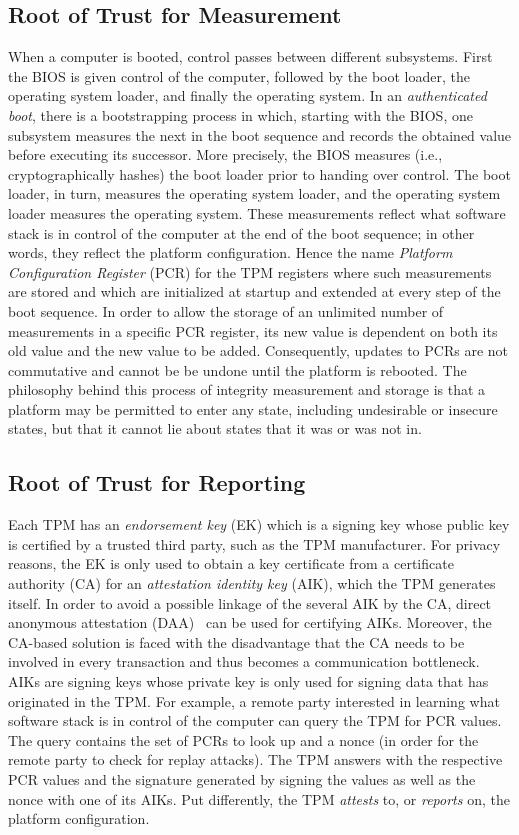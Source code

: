 \documentclass[runningheads]{llncs}
\begin{document}
\subsection{Root of Trust for Measurement}
When a computer is booted, control passes between different subsystems. First the BIOS is given
control of the computer, followed by the boot loader, the operating system loader, and finally the
operating system. In an \emph{authenticated boot}, there is a bootstrapping process in which,
starting with the BIOS, one subsystem measures the next in the boot sequence and records the
obtained value before executing its successor. More precisely, the BIOS measures (i.e.,
cryptographically hashes) the boot loader prior to handing over control. The boot loader, in turn,
measures the operating system loader, and the operating system loader measures the operating system.
These measurements reflect what software stack is in control of the computer at the end of the boot
sequence; in other words, they reflect the platform configuration. Hence the name \emph{Platform
Configuration Register} (PCR) for the TPM registers where such measurements are stored and which
are initialized at startup and extended at every step of the boot sequence. In order to allow the
storage of an unlimited number of measurements in a specific PCR register, its new value is
dependent on both its old value and the new value to be added. Consequently, updates to PCRs are
not commutative and cannot be be undone until the platform is rebooted. The philosophy behind this
process of integrity measurement and storage is that a platform may be permitted to enter any
state, including undesirable or insecure states, but that it cannot lie about states that it was
or was not in.

\subsection{Root of Trust for Reporting}
Each TPM has an \emph{endorsement key} (EK) which is a signing key whose public key is certified by
a trusted third party, such as the TPM manufacturer. For privacy reasons, the EK is only used to
obtain a key certificate from a certificate authority (CA) for an \emph{attestation identity key}
(AIK), which the TPM generates itself. In order to avoid a possible linkage of the several AIK by
the CA, direct anonymous attestation (DAA)~\cite{BrickellEtAl2004,Camenisch2004} can be used
for certifying AIKs. Moreover, the CA-based solution is faced with the disadvantage that the CA
needs to be involved in every transaction and thus becomes a communication bottleneck. AIKs are
signing keys whose private key is only used for signing data that has originated in the TPM. For
example, a remote party interested in learning what software stack is in control of the computer
can query the TPM for PCR values. The query contains the set of PCRs to look up and a nonce (in
order for the remote party to check for replay attacks). The TPM answers with the respective PCR
values and the signature generated by signing the values as well as the nonce with one of its AIKs.
Put differently, the TPM \emph{attests} to, or \emph{reports} on, the platform configuration.
\end{document}
